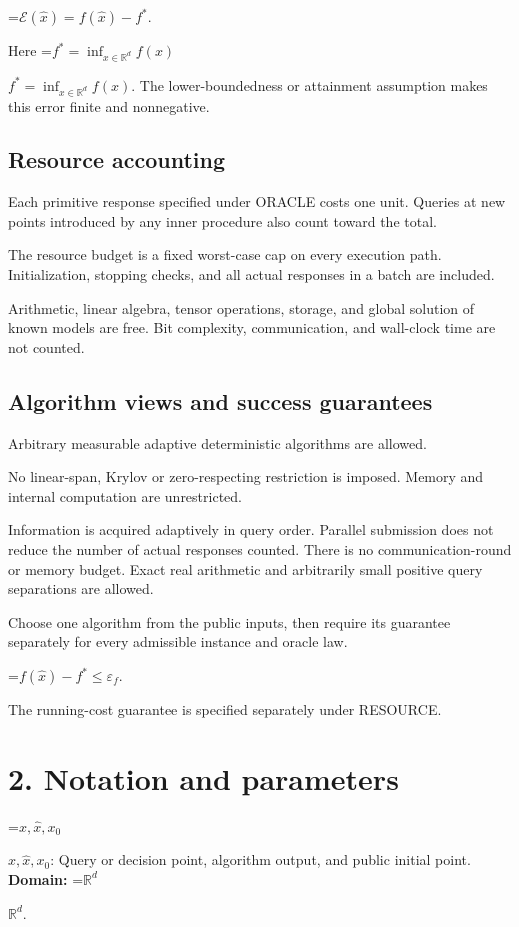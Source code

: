 \documentclass[10pt,a4paper]{article}
\newcommand{\AtlasMath}[1]{\par\begingroup\centering\setbox0=\hbox{$\displaystyle #1$}\ifdim\wd0>1.4\linewidth\typeout{ATLAS WIDE FORMULA: \the\wd0}\fi\ifdim\wd0>\linewidth\resizebox{\linewidth}{!}{\box0}\else\box0\fi\par\endgroup}
\newcommand{\AtlasInlineMath}[1]{\begingroup\setbox0=\hbox{$#1$}\ifdim\wd0>.4\linewidth\endgroup\AtlasMath{#1}\else\endgroup$#1$\fi}
\begin{document}
\AtlasMath{\mathcal{E}(\widehat{x})=f(\widehat{x})-f^*.}


Here \AtlasInlineMath{f^*=\inf_{x\in \mathbb{R}^d}f(x)}. The lower-boundedness or attainment assumption makes this error finite and nonnegative.

\subsection{Resource accounting}
Each primitive response specified under ORACLE costs one unit. Queries at new points introduced by any inner procedure also count toward the total.

The resource budget is a fixed worst-case cap on every execution path. Initialization, stopping checks, and all actual responses in a batch are included.

Arithmetic, linear algebra, tensor operations, storage, and global solution of known models are free. Bit complexity, communication, and wall-clock time are not counted.

\subsection{Algorithm views and success guarantees}
Arbitrary measurable adaptive deterministic algorithms are allowed.

No linear-span, Krylov or zero-respecting restriction is imposed. Memory and internal computation are unrestricted.

Information is acquired adaptively in query order. Parallel submission does not reduce the number of actual responses counted. There is no communication-round or memory budget. Exact real arithmetic and arbitrarily small positive query separations are allowed.

Choose one algorithm from the public inputs, then require its guarantee separately for every admissible instance and oracle law.


\AtlasMath{f(\widehat{x})-f^*\le \varepsilon_f.}


The running-cost guarantee is specified separately under RESOURCE.

\section{2. Notation and parameters}
\AtlasInlineMath{x,\widehat{x},x_0}: Query or decision point, algorithm output, and public initial point. \textbf{Domain:} \AtlasInlineMath{\mathbb{R}^d}.
\end{document}
